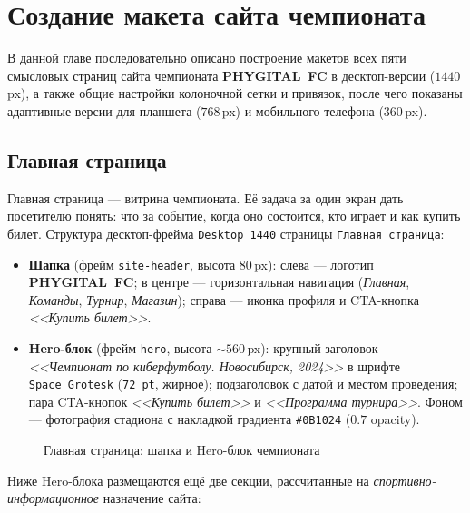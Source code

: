 \chapter{Создание макета сайта чемпионата}
\label{ch:practice}

В данной главе последовательно описано построение макетов всех пяти
смысловых страниц сайта чемпионата \textbf{PHYGITAL~FC} в десктоп-версии
(\(1440\,\)px), а также общие настройки колоночной сетки и привязок,
после чего показаны адаптивные версии для планшета (\(768\,\)px) и
мобильного телефона (\(360\,\)px).

\section{Главная страница}

Главная страница --- витрина чемпионата. Её задача за один экран дать
посетителю понять: что за событие, когда оно состоится, кто играет и
как купить билет. Структура десктоп-фрейма \texttt{Desktop~1440}
страницы \texttt{Главная~страница}:

\begin{itemize}
  \item \textbf{Шапка} (фрейм \texttt{site-header}, высота \(80\,\)px):
        слева --- логотип \textbf{PHYGITAL~FC}; в центре ---
        горизонтальная навигация (\textit{Главная}, \textit{Команды},
        \textit{Турнир}, \textit{Магазин}); справа --- иконка профиля
        и CTA-кнопка \textit{<<Купить билет>>}.
  \item \textbf{Hero-блок} (фрейм \texttt{hero}, высота \(\sim 560\,\)px):
        крупный заголовок \textit{<<Чемпионат по киберфутболу.
        Новосибирск, 2024>>} в шрифте \texttt{Space~Grotesk}
        (\texttt{72\,pt}, жирное); подзаголовок с датой и местом
        проведения; пара CTA-кнопок \textit{<<Купить билет>>} и
        \textit{<<Программа турнира>>}. Фоном --- фотография стадиона
        с накладкой градиента \texttt{\#0B1024} (\(0.7\) opacity).
\end{itemize}

\begin{figure}[h]
  \centering
  \caption{Главная страница: шапка и Hero-блок чемпионата}
  \label{fig:home_hero}
\end{figure}

Ниже Hero-блока размещаются ещё две секции, рассчитанные на
\emph{спортивно-информационное} назначение сайта:

